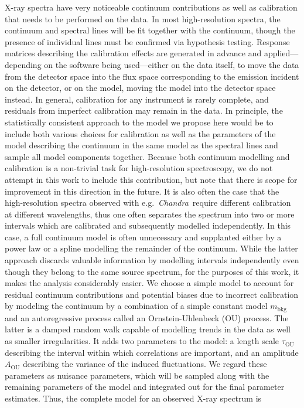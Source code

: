 \documentclass[12pt]{emulateapj}
\newcommand{\project}[1]{\textsl{#1}}
\newcommand{\chandra}{\project{Chandra}}
\newcommand{\mean}{m}
\begin{document}
X-ray spectra have very noticeable continuum contributions as well as calibration that needs to be performed on the data. In most high-resolution spectra, the continuum and spectral lines will be fit together with the continuum, though the presence of individual lines must be confirmed via hypothesis testing. Response matrices describing the calibration effects are generated in advance and applied---depending on the software being used---either on the data itself, to move the data from the detector space into the flux space corresponding to the emission incident on the detector, or on the model, moving the model into the detector space instead. In general, calibration for any instrument is rarely complete, and residuals from imperfect calibration may remain in the data. 
In principle, the statistically consistent approach to the model we propose here would be to include both various choices for calibration as well as the parameters of the model describing the continuum in the same model as the spectral lines and sample all model components together. Because both continuum modelling and calibration is a non-trivial task for high-resolution spectroscopy, we do not attempt in this work to include this contribution, but note that there is scope for improvement in this direction in the future. %
It is also often the case that the high-resolution spectra observed with e.g.\ \chandra\ require different calibration at different wavelengths, thus one often separates the spectrum into two or more intervals which are calibrated and subsequently modelled independently. In this case, a full continuum model is often unnecessary and supplanted either by a power law or a spline modelling the remainder of the continuum. While the latter approach discards valuable information by modelling intervals independently even though they belong to the same source spectrum, for the purposes of this work, it makes the analysis considerably easier.
We choose a simple model to account for residual continuum contributions and potential biases due to incorrect calibration by modeling the continuum by a combination of a simple constant model $\mean_{\mathrm{bkg}}$ and an autoregressive process called an Ornstein-Uhlenbeck (OU) process. The latter is a damped random walk capable of modelling trends in the data as well as smaller irregularities. It adds two parameters to the model: a length scale $\tau_{\mathrm{OU}}$ describing the interval within which correlations are important, and an amplitude $A_{\mathrm{OU}}$ describing the variance of the induced fluctuations. 
We regard these parameters as nuisance parameters, which will be sampled along with the remaining parameters of the model and integrated out for the final parameter estimates. 
Thus, the complete model for an observed X-ray spectrum is
\end{document}
